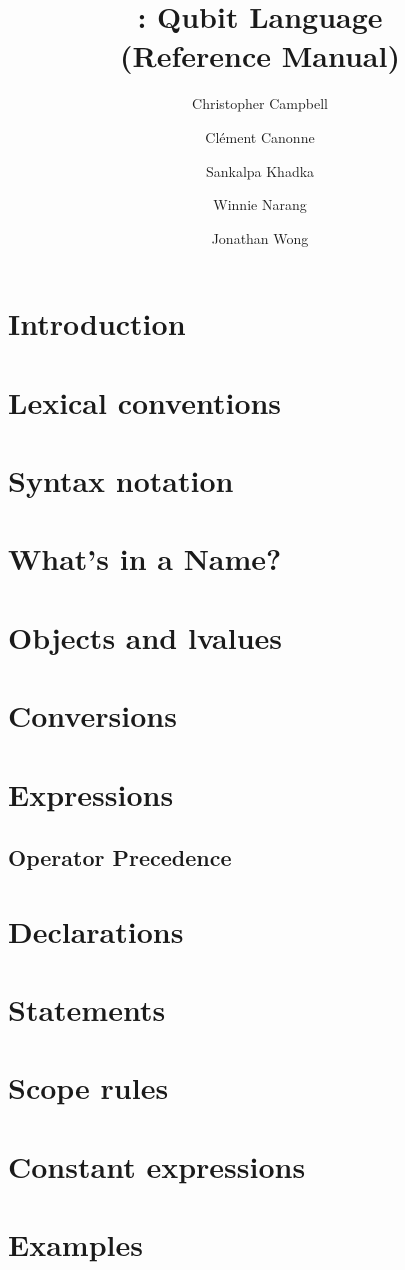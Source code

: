 \documentclass[11pt]{article}
\title{\QL: Qubit Language\\ \Large(Reference Manual)}
\author{
  Christopher Campbell
  \and Cl\'ement Canonne
  \and Sankalpa Khadka
  \and Winnie Narang
  \and Jonathan Wong
}
\begin{document}
\maketitle
\tableofcontents
\clearpage

\section{Introduction}
\section{Lexical conventions}

\section{Syntax notation}
\section{What's in a Name?}
\section{Objects and lvalues}
\section{Conversions}
\section{Expressions}
\subsection{Operator Precedence}

\section{Declarations}

\section{Statements}
\section{Scope rules}
\section{Constant expressions}

\section{Examples}

\end{document}
